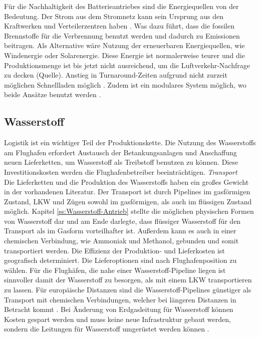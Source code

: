 %
Für die Nachhaltigkeit des Batterieantriebes sind die Energiequellen von der Bedeutung. 
Der Strom aus dem Stromnetz kann sein Ursprung aus den Kraftwerken und Verteilerzentren haben \cite{dalmia2022powering}. 
Was dazu führt, dass die fossilen Brennstoffe für die Verbrennung benutzt werden und dadurch zu Emissionen beitragen. 
Als Alternative wäre Nutzung der erneuerbaren Energiequellen, wie Windenergie oder Solarenergie. Diese Energie ist normalerweise teurer
und die Produktionsmenge ist bis jetzt nicht ausreichend, um die Luftverkehr-Nachfrage zu decken (Quelle).
Anstieg in Turnaround-Zeiten aufgrund nicht zurzeit möglichen Schnellladen möglich \cite{avogadro2024demystifying}.
Zudem ist ein modulares System möglich, wo beide Ansätze benutzt werden \cite{salucci2020optimal}.

\subsection{Wasserstoff}
Logistik ist ein wichtiger Teil der Produktionskette. 
Die Nutzung des Wasserstoffs am Flughafen erfordert Austausch der Betankungsanlagen und Anschaffung neuen Lieferketten, 
um Wasserstoff als Treibstoff benutzen zu können. Diese Investitionskosten werden die Flughafenbetreiber beeinträchtigen. 
\textit{Transport}\\
Die Lieferketten und die Produktion des Wasserstoffs haben ein großes Gewicht in der vorhandenen Literatur.
Der Transport ist durch Pipelines im gasförmigen Zustand, LKW und Zügen sowohl im gasförmigen, als auch im flüssigen Zustand möglich. 
Kapitel \ref{ss:Wasserstoff-Antrieb} stellte die möglichen physischen Formen von Wasserstoff dar und am Ende darlegte,
dass flüssiger Wasserstoff für den Transport als im Gasform vorteilhafter ist. 
Außerdem kann es auch in einer chemischen Verbindung, wie Ammoniak und Methanol, gebunden und somit transportiert werden.
%
%
%
% 
Die Effizienz der Produktion- und Lieferkosten ist geografisch determiniert. 
Die Lieferoptionen sind nach Flughafenposition zu wählen. Für die Flughäfen, die nahe einer Wasserstoff-Pipeline liegen ist sinnvoller
damit der Wasserstoff zu besorgen, als mit einem LKW transportieren zu lassen.
%
Für europäische Distanzen sind die Wasserstoff-Pipelines günstiger als Transport mit chemischen Verbindungen, 
welcher bei längeren Distanzen in Betracht kommt \cite{undertaking2022strategic}. 
Bei Änderung von Erdgasleitung für Wasserstoff können Kosten gespart
werden und muss keine neue Infrastruktur gebaut werden, sondern die Leitungen für Wasserstoff umgerüstet werden können \cite{undertaking2022strategic}.


